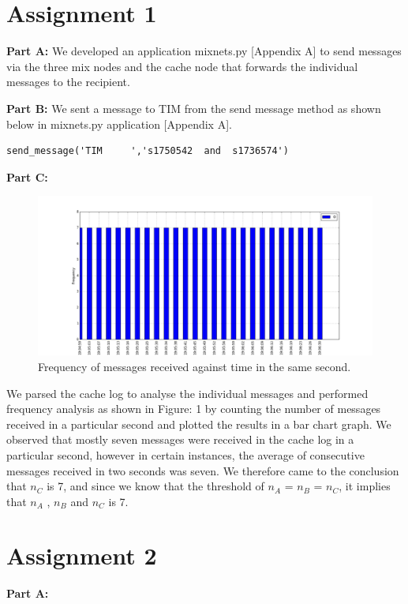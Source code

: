 \documentclass[preprint,12pt,3p]{elsarticle}
\begin{document}
\section*{Assignment 1}
\begin{flushleft}
\textbf{Part A:}
We developed an application mixnets.py [Appendix A] to send messages via the three mix nodes and the cache node that forwards the individual messages to the recipient.
\newline

\textbf{Part B:}
We sent a message to TIM from the send message method as shown below in mixnets.py application [Appendix A].
\begin{verbatim}send_message('TIM     ','s1750542  and  s1736574') \end{verbatim}

\textbf{Part C:}

\begin{figure}[h]
\caption{Frequency of messages received against time in the same second.}
\centering
\includegraphics[width=\textwidth]{one_c}
\end{figure}

We parsed the cache log to analyse the individual messages and performed frequency analysis as shown in Figure: 1 by counting the number of messages received in a particular second and plotted the results in a bar chart graph. We observed that mostly seven messages were received in the cache log in a particular second, however in certain instances, the average of consecutive messages received in two seconds was seven. We therefore came to the conclusion that $n_C$ is 7, and since we know that the threshold of $n_A$ = $n_B$ = $n_C$, it implies that $n_A$ , $n_B$ and $n_C$ is 7.

\section*{Assignment 2}
\textbf{Part A:}
\newline


\end{flushleft}
\end{document}
